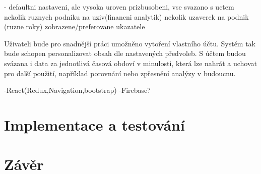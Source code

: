 - defaultni nastaveni, ale vysoka uroven prizbusobeni, vse svazano s uctem
 nekolik ruznych podniku na uziv(financni analytik)
 nekolik uzaverek na podnik (ruzne roky)
 zobrazene/preferovane ukazatele
 

Uživateli bude pro snadnější práci umožněno vytoření vlastního účtu. Systém tak bude schopen personalizovat obsah dle nastavených předvoleb. S účtem budou svázana i data za jednotlivá časová obdoví v minulosti, která lze nahrát a uchovat pro další použití, například porovnání nebo zpřesnění analýzy v budoucnu.

-React(Redux,Navigation,bootstrap)
-Firebase?
\chapter{Implementace a testování}
\chapter{Závěr}
